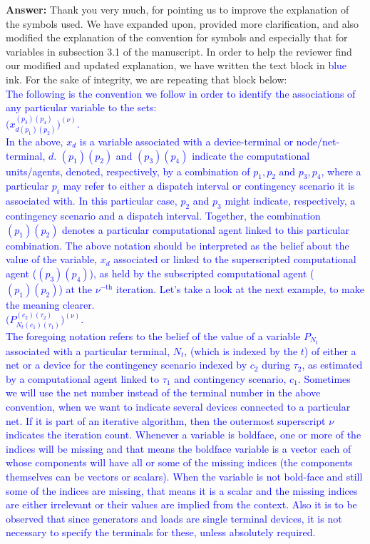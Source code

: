 \documentclass[8pt]{article}
\begin{document}
\textbf{Answer: }Thank you very much, for pointing us to improve the explanation of the symbols used. We have expanded upon, provided more clarification, and also modified the explanation of the convention for symbols and especially that for variables in subsection 3.1 of the manuscript. In order to help the reviewer find our modified and updated explanation, we have written the text block in \textcolor{blue}{blue} ink. For the sake of integrity, we are repeating that block below:\\
\textcolor{blue}{The following is the convention we follow in order to identify the associations of any particular variable to the sets:\\ $\Big(x_{d(p_1)(p_2)}^{(p_3)(p_4)}\Big)^{(\nu)}$.\\In the above, $x_d$ is a variable associated with a device-terminal or node/net-terminal, $d$. ${(p_1)(p_2)}$ and ${(p_3)(p_4)}$ indicate the computational units/agents, denoted, respectively, by a combination of $p_1, p_2$ and $p_3, p_4$, where a particular $p_i$ may refer to either a dispatch interval or contingency scenario it is associated with. In this particular case, $p_2$ and $p_3$ might indicate, respectively, a contingency scenario and a dispatch interval. Together, the combination ${(p_1)(p_2)}$ denotes a particular computational agent linked to this particular combination. The above notation should be interpreted as the belief about the value of the variable, $x_d$ associated or linked to the superscripted computational agent (${(p_3)(p_4)}$), as held by the subscripted computational agent (${(p_1)(p_2)}$) at the $\nu^{-\text{th}}$ iteration. Let's take a look at the next example, to make the meaning clearer.\\ $\Big(P_{{N}_{t}(c_1)(\tau_1)}^{(c_2)(\tau_2)}\Big)^{(\nu)}$.\\The foregoing notation refers to the belief of the value of a variable $P_{N_t}$ associated with a particular terminal, $N_t$, (which is indexed by the $t$) of either a net or a device for the contingency scenario indexed by $c_2$ during $\tau_2$, as estimated by a computational agent linked to $\tau_1$ and contingency scenario, $c_1$. Sometimes we will use the net number instead of the terminal number in the above convention, when we want to indicate several devices connected to a particular net. If it is part of an iterative algorithm, then the outermost superscript $\nu$ indicates the iteration count. Whenever a variable is boldface, one or more of the indices will be missing and that means the boldface variable is a vector each of whose components will have all or some of the missing indices (the components themselves can be vectors or scalars). When the variable is not bold-face and still some of the indices are missing, that means it is a scalar and the missing indices are either irrelevant or their values are implied from the context. Also it is to be observed that since generators and loads are single terminal devices, it is not necessary to specify the terminals for these, unless absolutely required.}\\
\end{document}
